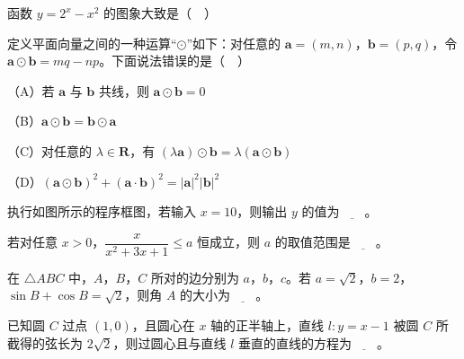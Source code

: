 \begingroup
\renewenvironment{question}{\Needspace{0.5\textheight}}{}
\begin{question}
函数 $y=2^x-x^2$ 的图象大致是（　）
\nopagebreak[4]
\begin{center}\end{center}
\nopagebreak[4]
\end{question}
\endgroup
\begin{question}
定义平面向量之间的一种运算“$\odot$”如下：对任意的 $\boldsymbol a=(m,n)$，$\boldsymbol b=(p,q)$，令 $\boldsymbol a\odot\boldsymbol b=mq-np$。下面说法错误的是（　）

（A）若 $\boldsymbol a$ 与 $\boldsymbol b$ 共线，则 $\boldsymbol a\odot\boldsymbol b=0$

（B）$\boldsymbol a\odot\boldsymbol b=\boldsymbol b\odot\boldsymbol a$

（C）对任意的 $\lambda\in\mathbf R$，有 $(\lambda\boldsymbol a)\odot\boldsymbol b=\lambda(\boldsymbol a\odot\boldsymbol b)$

（D）$(\boldsymbol a\odot\boldsymbol b)^2+(\boldsymbol a\cdot\boldsymbol b)^2=|\boldsymbol a|^2|\boldsymbol b|^2$

\end{question}

\Needspace{0.4\textheight}
\begingroup
\renewenvironment{question}{\Needspace{0.5\textheight}}{}
\begin{question}
执行如图所示的程序框图，若输入 $x=10$，则输出 $y$ 的值为$\underline{\qquad}$。
\nopagebreak[4]
\begin{center}\end{center}
\nopagebreak[4]
\end{question}
\endgroup
\begin{question}
若对任意 $x>0$，$\dfrac{x}{x^2+3x+1}\leqslant a$ 恒成立，则 $a$ 的取值范围是$\underline{\qquad}$。

\end{question}
\begin{question}
在 $\triangle ABC$ 中，$A$，$B$，$C$ 所对的边分别为 $a$，$b$，$c$。若 $a=\sqrt2$，$b=2$，$\sin B+\cos B=\sqrt2$，则角 $A$ 的大小为$\underline{\qquad}$。

\end{question}
\begin{question}
已知圆 $C$ 过点 $(1,0)$，且圆心在 $x$ 轴的正半轴上，直线 $l:y=x-1$ 被圆 $C$ 所截得的弦长为 $2\sqrt2$，则过圆心且与直线 $l$ 垂直的直线的方程为$\underline{\qquad}$。

\end{question}

